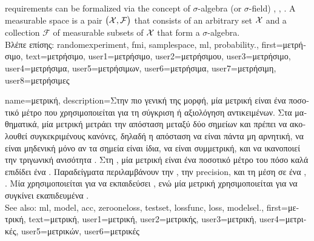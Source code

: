 {{		requirements can be formalized via the concept of $\sigma$-algebra (or $\sigma$-field) 
		\cite{RudinBook}, \cite{BillingsleyProbMeasure}, \cite{durrett2010probability}. 
		A measurable space is a pair $\big(\mathcal{X},\mathcal{F}\big)$ that consists of an arbitrary set $\mathcal{X}$ and a 
		collection $\mathcal{F}$ of measurable subsets of $\mathcal{X}$ that form a $\sigma$-algebra. \\
		\foreignlanguage{greek}{Βλέπε επίσης:} \gls{randomexperiment}, \gls{fmi}, \gls{samplespace}, \gls{ml}, \gls{probability}.},
	first={\foreignlanguage{greek}{μετρήσιμο}},
	text={\foreignlanguage{greek}{μετρήσιμο}},
	user1={\foreignlanguage{greek}{μετρήσιμο}}, %
  	user2={\foreignlanguage{greek}{μετρήσιμου}}, %
	user3={\foreignlanguage{greek}{μετρήσιμο}}, %
	user4={\foreignlanguage{greek}{μετρήσιμα}}, %
  	user5={\foreignlanguage{greek}{μετρήσιμων}}, %
	user6={\foreignlanguage{greek}{μετρήσιμα}}, %
	user7={\foreignlanguage{greek}{μετρήσιμη}}, %
	user8={\foreignlanguage{greek}{μετρήσιμες}} %
}

{name={\foreignlanguage{greek}{μετρική}},
	description={\foreignlanguage{greek}{Στην πιο γενική της μορφή, μία μετρική} 
		\foreignlanguage{greek}{είναι ένα ποσοτικό μέτρο που χρησιμοποιείται για τη σύγκριση ή αξιολόγηση αντικειμένων.  
		Στα μαθηματικά, μία μετρική μετράει την απόσταση μεταξύ δύο σημείων και πρέπει να ακολουθεί συγκεκριμένους 
		κανόνες, δηλαδή η απόσταση να είναι πάντα μη αρνητική, να είναι μηδενική μόνο αν τα σημεία είναι ίδια, να είναι 
		συμμετρική, και να ικανοποιεί την τριγωνική ανισότητα} \cite{RudinBookPrinciplesMatheAnalysis}. 
		\foreignlanguage{greek}{Στη} , \foreignlanguage{greek}{μία μετρική είναι ένα ποσοτικό μέτρο  
		του πόσο καλά επιδίδει ένα} . \foreignlanguage{greek}{Παραδείγματα περιλαμβάνουν την} 
		, \foreignlanguage{greek}{την} precision, \foreignlanguage{greek}{και τη μέση}  
		\foreignlanguage{greek}{σε ένα}  \cite{Goodfellow-et-al-2016}, \cite{BishopBook}. 
		\foreignlanguage{greek}{Μία}  \foreignlanguage{greek}{χρησιμοποιείται για να εκπαιδεύσει} , 
		\foreignlanguage{greek}{ενώ μία μετρική χρησιμοποιείται για να συγκίνει εκαπιδευμένα} . 
		\\ See also: \gls{ml}, \gls{model}, \gls{acc}, \gls{zerooneloss}, \gls{testset}, \gls{lossfunc}, \gls{loss}, \gls{modelsel}.},
	first={\foreignlanguage{greek}{μετρική}}, 
	text={\foreignlanguage{greek}{μετρική}},
	user1={\foreignlanguage{greek}{μετρική}}, %
	user2={\foreignlanguage{greek}{μετρικής}}, %
	user3={\foreignlanguage{greek}{μετρική}}, %
	user4={\foreignlanguage{greek}{μετρικές}}, %
	user5={\foreignlanguage{greek}{μετρικών}}, %
	user6={\foreignlanguage{greek}{μετρικές}} %
}


